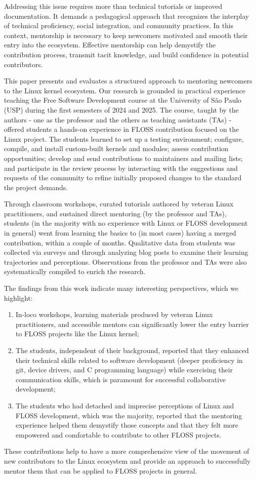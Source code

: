 Addressing this issue requires more than technical tutorials or improved
documentation. It demands a pedagogical approach that recognizes the interplay
of technical proficiency, social integration, and community practices. In this
context, mentorship is necessary to keep newcomers motivated and smooth their
entry into the ecosystem. Effective mentorship can help demystify the
contribution process, transmit tacit knowledge, and build confidence in
potential contributors.

This paper presents and evaluates a structured approach to mentoring newcomers
to the Linux kernel ecosystem. Our research is grounded in practical experience
teaching the Free Software Development course at the University of São Paulo
(USP) during the first semesters of 2024 and 2025. The course, taught by the
authors - one as the professor and the others as teaching assistants (TAs) -
offered students a hands-on experience in FLOSS contribution focused on the
Linux project. The students learned to set up a testing environment; configure,
compile, and install custom-built kernels and modules; assess contribution
opportunities; develop and send contributions to maintainers and mailing lists;
and participate in the review process by interacting with the suggestions and
requests of the community to refine initially proposed changes to the standard
the project demands.

Through classroom workshops, curated tutorials authored by veteran Linux
practitioners, and sustained direct mentoring (by the professor and TAs),
students (in the majority with no experience with Linux or FLOSS development in
general) went from learning the basics to (in most cases) having a merged
contribution, within a couple of months. Qualitative data from students was
collected via surveys and through analyzing blog posts to examine their learning
trajectories and perceptions. Observations from the professor and TAs were also
systematically compiled to enrich the research.

The findings from this work indicate many interesting perspectives, which we
highlight:

\begin{enumerate}
    \item In-loco workshops, learning materials produced by veteran Linux
    practitioners, and accessible mentors can significantly lower the entry
    barrier to FLOSS projects like the Linux kernel;
    \item The students, independent of their background, reported that they
    enhanced their technical skills related to software development (deeper
    proficiency in git, device drivers, and C programming language) while
    exercising their communication skills, which is paramount for successful
    collaborative development;
    \item The students who had detached and imprecise perceptions of Linux and
    FLOSS development, which was the majority, reported that the mentoring
    experience helped them demystify those concepts and that they felt more
    empowered and comfortable to contribute to other FLOSS projects.  
\end{enumerate}


These contributions help to have a more comprehensive view of the movement of
new contributors to the Linux ecosystem and provide an approach to successfully
mentor them that can be applied to FLOSS projects in general.